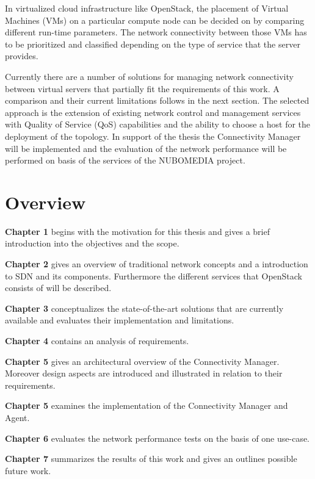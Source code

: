 \newpage
In virtualized cloud infrastructure like OpenStack, the placement of Virtual Machines (VMs) on a particular compute node can be decided on by comparing different run-time parameters. The network connectivity between those VMs has to be prioritized and classified depending on the type of service that the server provides.

Currently there are a number of solutions for managing network connectivity between virtual servers that partially fit the requirements of this work. A comparison and their current limitations follows in the next section. The selected approach is the extension of existing network control and management services with Quality of Service (QoS) capabilities and the ability to choose a host for the deployment of the topology. In support of the thesis the Connectivity Manager will be implemented and the evaluation of the network performance will be performed on basis of the services of the NUBOMEDIA project.


\section{Overview}

\textbf{Chapter 1} begins with the motivation for this thesis and gives a brief introduction into the objectives and the scope.

\textbf{Chapter 2} gives an overview of traditional network concepts and a introduction to SDN and its components. Furthermore the different services that OpenStack consists of will be described.

\textbf{Chapter 3} conceptualizes the state-of-the-art solutions that are currently available and evaluates their implementation and limitations.

\textbf{Chapter 4} contains an analysis of requirements.

\textbf{Chapter 5} gives an architectural overview of the Connectivity Manager. Moreover design aspects are introduced and illustrated in relation to their requirements.

\textbf{Chapter 5} examines the implementation of the Connectivity Manager and Agent.

\textbf{Chapter 6} evaluates the network performance tests on the basis of one use-case.

\textbf{Chapter 7} summarizes the results of this work and gives an outlines possible future work.


